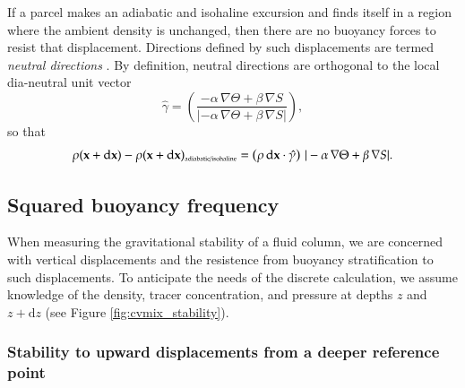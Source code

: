 If a parcel makes an adiabatic and isohaline excursion and finds
itself in a region where the ambient density is unchanged, then there
are no buoyancy forces to resist that displacement.  Directions
defined by such displacements are termed {\it neutral directions}
\citep{McDougall1987a}.  By definition, neutral directions are
orthogonal to the local dia-neutral unit vector
\begin{equation}
 \hat{\gamma} = \left( \frac{-\alpha \, \nabla \Theta + \beta \, \nabla S}
                          {|-\alpha \, \nabla \Theta + \beta \, \nabla S|}
 \right),
\end{equation}
 so that 
\begin{equation}
\rho({\bf x} + \mathrm{d} {\bf x})  - \rho({\bf x} + \mathrm{d} {\bf x})_{\mbox{\tiny  adiabatic/isohaline}} 
 = 
 \left( \rho \, \mathrm{d}{\bf x} \cdot \hat{\gamma} \right) \, 
 |-\alpha \, \nabla \Theta + \beta \, \nabla  S |. 
\end{equation}


\subsection{Squared buoyancy frequency}
\label{subsection:buoyancy-frequency-and-stability}

When measuring the gravitational stability of a fluid column, we are
concerned with vertical displacements and the resistence from buoyancy
stratification to such displacements.  To anticipate the needs of the
discrete calculation, we assume knowledge of the density, tracer
concentration, and pressure at depths $z$ and $z+\mathrm{d}z$ (see
Figure \ref{fig:cvmix_stability}).


\subsubsection{Stability to upward displacements from a deeper reference point}

